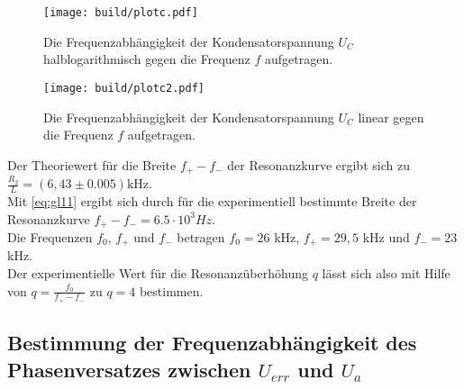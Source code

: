 
\begin{figure}
  \centering
  \texttt{[image: build/plotc.pdf]}
  \caption{Die Frequenzabhängigkeit der Kondensatorspannung $U_C$ halblogarithmisch gegen die Frequenz $f$ aufgetragen.}
  \label{fig:plotc}
\end{figure}




\begin{figure}
  \centering
  \texttt{[image: build/plotc2.pdf]}
  \caption{Die Frequenzabhängigkeit der Kondensatorspannung $U_C$ linear gegen die Frequenz $f$ aufgetragen.}
  \label{fig:plotc2}
\end{figure}

Der Theoriewert für die Breite $f_+-f_-$ der Resonanzkurve ergibt sich zu $\frac{R_2}{L} = (6,43 \pm 0.005)\mathrm{kHz}$.\\ 
Mit \autoref{eq:gl11} ergibt sich durch für die experimentiell bestimmte Breite der Resonanzkurve $f_+ - f_- = 6.5 \cdot 10^3 Hz$. \\
Die Frequenzen $f_0$, $f_+$ und $f_-$ betragen $f_0 = 26$ kHz, $f_+ = 29,5$ kHz und $f_- = 23$ kHz. \\
Der experimentielle Wert für die Resonanzüberhöhung $q$ lässt sich also mit Hilfe von $q = \frac{f_0}{f_+ - f_-}$ zu $q = 4$ bestimmen. \\




\subsection{Bestimmung der Frequenzabhängigkeit des Phasenversatzes zwischen $U_{err}$ und $U_{a}$}
\label{Phasenversatz}


